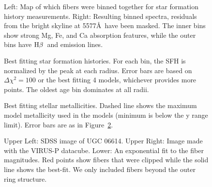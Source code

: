 \documentclass[12pt,preprint]{aastex}
\newcommand\hb{$\rm{H}\beta$}
\newcommand\HI{\ion{H}{1}}
\begin{document}
\begin{figure*}
\caption{Rotation curves extracted from the best fitting models in Fig~\ref{malin_kinem_fibers}.
The dashed curves show the expected stellar mass contribution to the rotation curve.
Vertical lines mark $R_e$ and $5R_e$.
Right panel includes \HI\ data from \citet{Pickering97}.
\label{malin_kinem}}
\end{figure*}



\begin{figure}
\caption{Left:  Map of which fibers were binned together for star formation history measurements.
Right:  Resulting binned spectra, residuals from the bright skyline at 5577\AA\ have been masked.
The inner bins show strong Mg, Fe, and Ca absorption features, while the outer bins have \hb\ and  emission lines. \label{malin2_binmap}}
\end{figure}


\begin{figure}
\caption{ Best fitting star formation histories.
For each bin, the SFH is normalized by the peak at each radius.
Error bars are based on $\Delta\chi^2=100$ or the best fitting 4 models, whichever provides more points.
The oldest age bin dominates at all radii.
\label{sfh_malin2} }
\end{figure}


\begin{figure}
\caption{Best fitting stellar metallicities.
 Dashed line shows the maximum model metallicity used in the models (minimum is below the y range limit).
Error bars are as in Figure~\ref{sfh_malin2}.
\label{metal_malin2}}
\end{figure}


\begin{figure}
\caption{Upper Left:  SDSS image of UGC 06614.
Upper Right:  Image made with the VIRUS-P datacube.
Lower:  An exponential fit to the fiber magnitudes.
Red points show fibers that were clipped while the solid line shows the best-fit.
We only included fibers beyond the outer ring structure.
\label{ugc_fibers} }
\end{figure}
\end{document}
